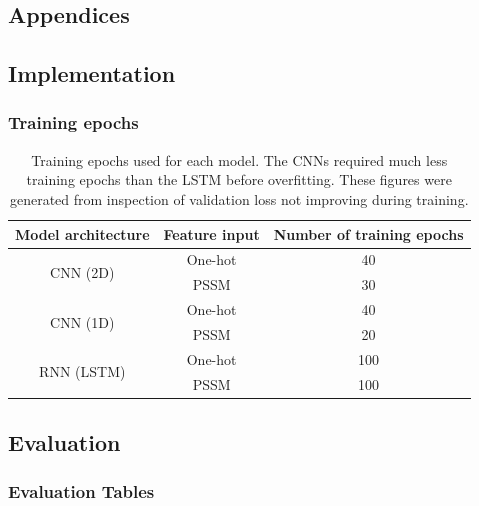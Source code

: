 \documentclass{l4proj}
\begin{document}
%
% 

\begin{appendices}

\chapter{Appendices}

\section{Implementation}

\subsection{Training epochs}

\begin{table}[!htb]
    \centering
    \caption{Training epochs used for each model. The CNNs required much less training epochs than the LSTM before overfitting. These figures were generated from inspection of validation loss not improving during training.}
    \begin{tabular}{@{}ccc@{}}
    \toprule
    Model architecture & Feature input & Number of training epochs \\ \midrule
    \multirow{2}{*}{CNN (2D)} & One-hot & 40 \\
     & PSSM & 30 \\
    \multirow{2}{*}{CNN (1D)} & One-hot & 40 \\
     & PSSM & 20 \\
    \multirow{2}{*}{RNN (LSTM)} & One-hot & 100 \\
     & PSSM & 100 \\ \cmidrule(l){1-3} 
    \end{tabular}
    
    \label{tab:trainepochs}
\end{table}

\newpage
\section{Evaluation}

\subsection{Evaluation Tables}


\end{appendices}
\end{document}
